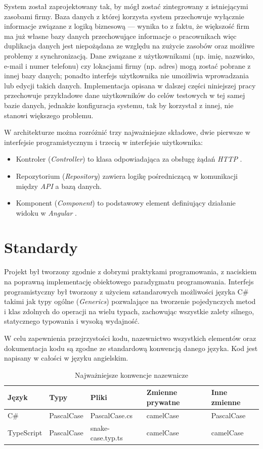 \documentclass[eng,printmode,openany]{mgr}
\begin{document}
	System został zaprojektowany tak, by mógł zostać zintegrowany z istniejącymi zasobami firmy. Baza danych z której korzysta system przechowuje wyłącznie informacje związane z logiką biznesową — wynika to z faktu, że większość firm ma już własne bazy danych przechowujące informacje o pracownikach więc duplikacja danych jest niepożądana ze względu na zużycie zasobów oraz możliwe problemy z synchronizacją. Dane związane z użytkownikami (np. imię, nazwisko, e-mail i numer telefonu) czy lokacjami firmy (np. adres) mogą zostać pobrane z innej bazy danych; ponadto interfejs użytkownika nie umożliwia wprowadzania lub edycji takich danych. Implementacja opisana w dalszej części niniejszej pracy przechowuje przykładowe dane użytkowników do celów testowych w tej samej bazie danych, jednakże konfiguracja systemu, tak by korzystał z innej, nie stanowi większego problemu.
	
	W architekturze można rozróżnić trzy najważniejsze składowe, dwie pierwsze w interfejsie programistycznym i trzecią w interfejsie użytkownika:
	\begin{itemize}
		\item Kontroler (\textit{Controller}) to klasa odpowiadająca za obsługę żądań \textit{HTTP} \cite{msdn-aspnet-api}.
		\item Repozytorium (\textit{Repository}) zawiera logikę pośredniczącą w komunikacji między \textit{API} a bazą danych.
		\item Komponent (\textit{Component}) to podstawowy element definiujący działanie widoku w \textit{Angular} \cite{angular-components}.
	\end{itemize}
	
	\section{Standardy}
	Projekt był tworzony zgodnie z dobrymi praktykami programowania, z naciskiem na poprawną implementację obiektowego paradygmatu programowania. Interfejs programistyczny był tworzony z użyciem sztandarowych możliwości języka C\# takimi jak typy ogólne \cite{msdn-generics} (\textit{Generics}) pozwalające na tworzenie pojedynczych metod i klas zdolnych do operacji na wielu typach, zachowując wszystkie zalety silnego, statycznego typowania i wysoką wydajność.
	
	W celu zapewnienia przejrzystości kodu, nazewnictwo wszystkich elementów oraz dokumentacja kodu są zgodne ze standardową konwencją danego języka. Kod jest napisany w całości w języku angielskim.
	\begin{table}[H]
		\caption{Najważniejsze konwencje nazewnicze}
		\begin{tabularx}{\textwidth}{|l|l|l|l|X|}
			\hline
			Język      & Typy       			& Pliki                 & Zmienne prywatne & Inne zmienne \\ \hline
			C\# \cite{msdn-gnc}     & PascalCase & PascalCase.cs   		& camelCase        & PascalCase   \\ \hline
			TypeScript \cite{angular-sg} & PascalCase & snake-case.typ.ts 	& camelCase        & camelCase    \\ \hline
		\end{tabularx}
	\end{table}
	
\end{document}

